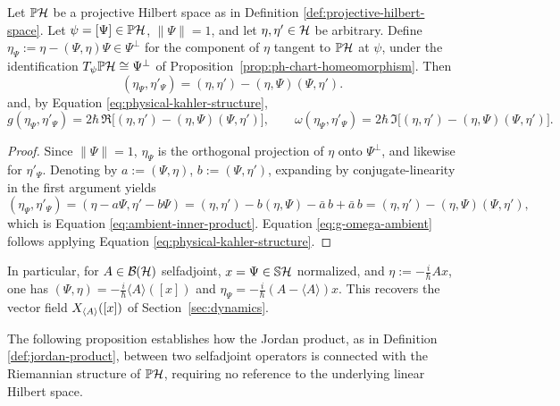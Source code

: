 \begin{lemma}
	\label{lem:g-omega-ambient}
	Let $\PH$ be a projective Hilbert space as in Definition \ref{def:projective-hilbert-space}. Let $\psi=[\Psi]\in\PH$, $\|\Psi\|=1$, and let $\eta,\eta'\in\H$ be
	arbitrary. Define $\eta_\Psi:=\eta-(\Psi,\eta)\Psi\in\Psi^\perp$ for the
	component of $\eta$ tangent to $\PH$ at $\psi$, under the identification
	$T_\psi\PH\cong\Psi^\perp$ of Proposition~\ref{prop:ph-chart-homeomorphism}.
	Then
	\begin{equation}
		(\eta_\Psi,\eta'_\Psi)=(\eta,\eta')-(\eta,\Psi)(\Psi,\eta'). \label{eq:ambient-inner-product}
	\end{equation}
	and, by Equation \eqref{eq:physical-kahler-structure},
	\begin{equation}
		g(\eta_\Psi,\eta'_\Psi)=2\hbar\,\Re\big[(\eta,\eta')-(\eta,\Psi)(\Psi,\eta')\big], \qquad
		\omega(\eta_\Psi,\eta'_\Psi)=2\hbar\,\Im\big[(\eta,\eta')-(\eta,\Psi)(\Psi,\eta')\big]. \label{eq:g-omega-ambient}
	\end{equation}
\end{lemma}
\begin{proof}
	Since $\|\Psi\|=1$, $\eta_\Psi$ is the orthogonal projection of $\eta$ onto $\Psi^\perp$, and likewise for $\eta'_\Psi$. Denoting by $a:=(\Psi,\eta)$, $b:=(\Psi,\eta')$, expanding by conjugate-linearity in the first argument yields
	\[
		(\eta_\Psi,\eta'_\Psi)=(\eta-a\Psi,\eta'-b\Psi)
		=(\eta,\eta')-b(\eta,\Psi)-\bar a\,b+\bar a\,b
		=(\eta,\eta')-(\eta,\Psi)(\Psi,\eta'),
	\]
	which is Equation \eqref{eq:ambient-inner-product}. Equation \eqref{eq:g-omega-ambient} follows applying Equation \eqref{eq:physical-kahler-structure}.
\end{proof}

\begin{remark}
	In particular, for $A\in\BH$ selfadjoint, $x=\Psi \in \mathbb{S}\H$ normalized, and $\eta:=-\frac i\hbar Ax$, one has $(\Psi,\eta)=-\frac i\hbar\langle A\rangle([x])$ and $\eta_\Psi=-\frac i\hbar(A-\langle A\rangle)x$. This recovers the vector field $X_{\langle A\rangle}([x])$ of Section~\ref{sec:dynamics}.
\end{remark}

\noindent The following proposition establishes how the Jordan product, as in Definition \ref{def:jordan-product}, between two selfadjoint operators is connected with the Riemannian structure of $\PH$, requiring no reference to the underlying linear Hilbert space.

